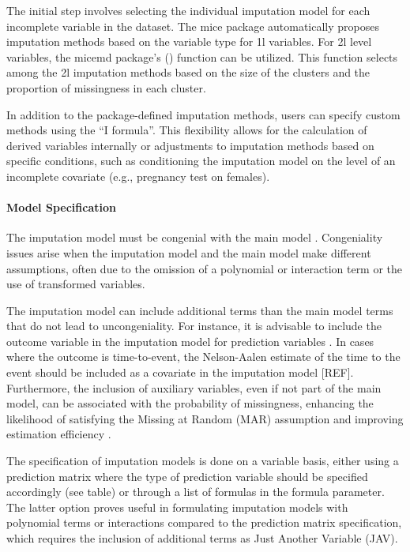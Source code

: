\documentclass[
]{jss}
\begin{document}
The initial step involves selecting the individual imputation model for
each incomplete variable in the dataset. The mice package automatically
proposes imputation methods based on the variable type for 1l variables.
For 2l level variables, the micemd package's () function can be
utilized. This function selects among the 2l imputation methods based on
the size of the clusters and the proportion of missingness in each
cluster.

In addition to the package-defined imputation methods, users can specify
custom methods using the ``I formula''. This flexibility allows for the
calculation of derived variables internally or adjustments to imputation
methods based on specific conditions, such as conditioning the
imputation model on the level of an incomplete covariate (e.g.,
pregnancy test on females).

\hypertarget{model-specification}{%
\paragraph{Model Specification}\label{model-specification}}

The imputation model must be congenial with the main model
\cite{Meng_1994}. Congeniality issues arise when the imputation model
and the main model make different assumptions, often due to the omission
of a polynomial or interaction term or the use of transformed variables.

The imputation model can include additional terms than the main model
terms that do not lead to uncongeniality. For instance, it is advisable
to include the outcome variable in the imputation model for prediction
variables \cite{Moons}. In cases where the outcome is time-to-event, the
Nelson-Aalen estimate of the time to the event should be included as a
covariate in the imputation model {[}REF{]}. Furthermore, the inclusion
of auxiliary variables, even if not part of the main model, can be
associated with the probability of missingness, enhancing the likelihood
of satisfying the Missing at Random (MAR) assumption and improving
estimation efficiency \cite{Hardt_2012}.

The specification of imputation models is done on a variable basis,
either using a prediction matrix where the type of prediction variable
should be specified accordingly (see table) or through a list of
formulas in the formula parameter. The latter option proves useful in
formulating imputation models with polynomial terms or interactions
compared to the prediction matrix specification, which requires the
inclusion of additional terms as Just Another Variable (JAV).
\end{document}
